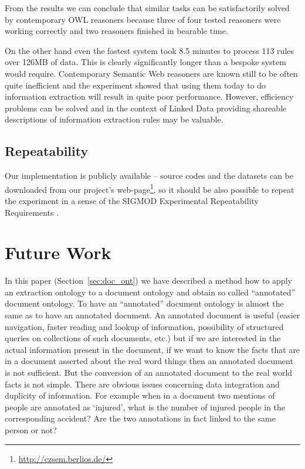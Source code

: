 From the results we can conclude that similar tasks can be satisfactorily solved by contemporary OWL reasoners because three of four tested reasoners were working correctly and two reasoners finished in bearable time.

On the other hand even the fastest system took 8.5 minutes to process 113 rules over 126MB of data. This is clearly   significantly longer than a bespoke system would require. 
Contemporary Semantic Web reasoners are known still to be often quite inefficient and the experiment showed that using them today to do information extraction will result in quite poor performance. However, efficiency problems can be solved
and in the context of Linked Data providing shareable descriptions of information extraction rules may be valuable.





\subsection{Repeatability}

Our implementation is publicly available -- source codes and the datasets can be downloaded from our project's web-page\footnote{\url{http://czsem.berlios.de/}}, so it should be also possible to repeat the experiment in a sense of  the SIGMOD Experimental Repeatability Requirements \citep{biblio:SIGMODrepeatability}.

\section{Future Work}


In this paper (Section~\ref{sec:doc_ont}) we have described a method how to apply an extraction ontology to a document ontology and obtain so called ``annotated'' document ontology. To have an ``annotated'' document ontology is almost the same as to have an annotated document. An annotated document is useful (easier navigation, faster reading and lookup of information, possibility of structured queries on collections of such documents, etc.) but if we are interested in the actual information present in the document, if we want to know the facts that are in a document asserted about the real word things then an annotated document is not sufficient. But the conversion of an annotated document to the real world facts is not simple.
There are obvious issues concerning data integration and duplicity of information. For example when in a document two mentions of people are annotated as `injured', what is the number of injured people in the corresponding accident? Are the two annotations in fact linked to the same person or not?

